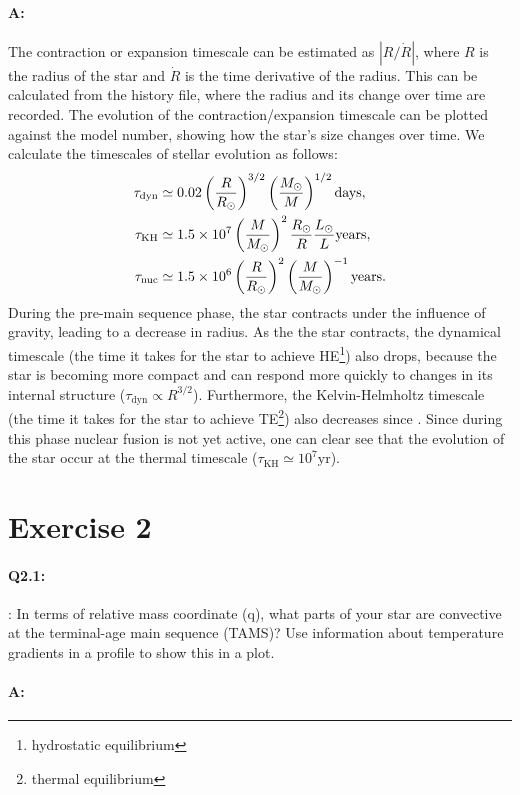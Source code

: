 \documentclass[twocolumn,fontsize=11pt]{scrartcl}
\begin{document}
\paragraph{A:} The contraction or expansion timescale can be estimated as \(\left|R/\dot{R}\right|\), where \(R\) is the radius of the star and \(\dot{R}\) is the time derivative of the radius. This can be calculated from the history file, where the radius and its change over time are recorded. The evolution of the contraction/expansion timescale can be plotted against the model number, showing how the star's size changes over time. We calculate the timescales of stellar evolution as follows:
\begin{align*}
    \tau_{\text{dyn}} &\simeq 0.02 \left(\frac{R}{R_\odot}\right)^{3/2} \left(\frac{M_\odot}{M}\right)^{1/2} \text{days}, \\
    \tau_{\text{KH}} &\simeq 1.5 \times 10^7\left(\frac{M}{M_\odot}\right)^{2} \frac{R_\odot}{R}\frac{L_\odot}{L} \text{years}, \\
    \tau_{\text{nuc}} &\simeq 1.5 \times 10^6\left(\frac{R}{R_\odot}\right)^{2} \left(\frac{M}{M_\odot}\right)^{-1} \text{years}.
\end{align*}
During the pre-main sequence phase, the star contracts under the influence of gravity, leading to a decrease in radius. As the the star contracts, the dynamical timescale (the time it takes for the star to achieve HE\footnote{hydrostatic equilibrium}) also drops, because the star is becoming more compact and can respond more quickly to changes in its internal structure (\(\tau_{\text{dyn}} \propto R^{3/2}\)). Furthermore, the Kelvin-Helmholtz timescale (the time it takes for the star to achieve TE\footnote{thermal equilibrium}) also decreases since . Since during this phase nuclear fusion is not yet active, one can clear see that the evolution of the star occur at the thermal timescale (\(\tau_{\text{KH}} \simeq 10^7 \text{yr}\)).

\section{Exercise 2}

\paragraph{Q2.1:} : In terms of relative mass coordinate (q), what parts of your star are convective at the
terminal-age main sequence (TAMS)? Use information about temperature gradients in
a profile to show this in a plot.

\paragraph{A:} 

\printbibliography
\end{document}
